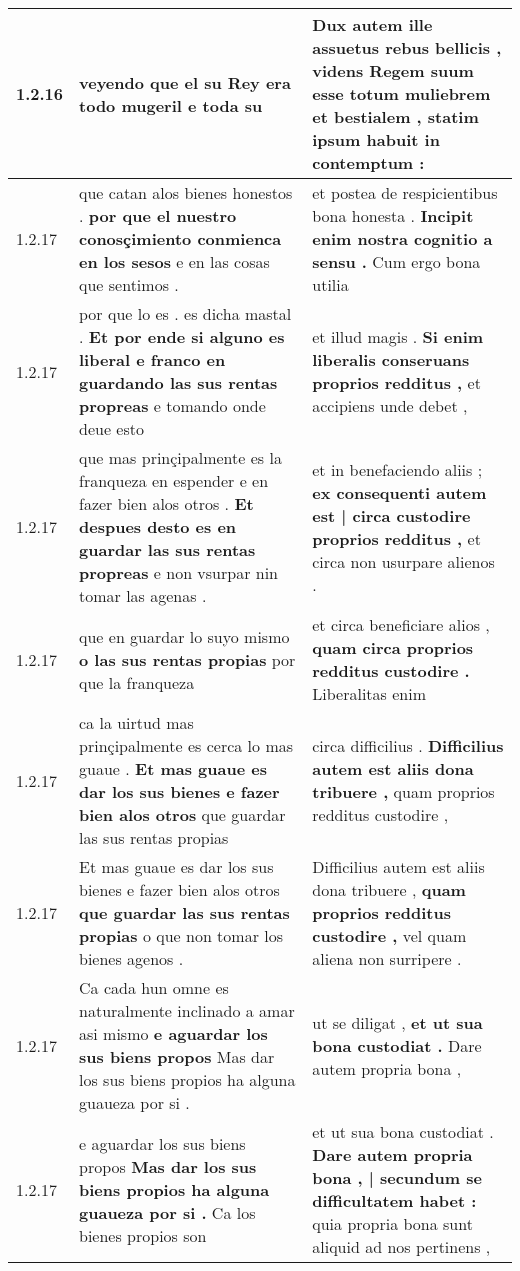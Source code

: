 \begin{tabular}{|p{1cm}|p{6.5cm}|p{6.5cm}|}
1.2.16 & veyendo \textbf{ que el su Rey era todo mugeril } e toda su & Dux autem ille assuetus rebus bellicis , \textbf{ videns Regem suum esse totum muliebrem et bestialem , } statim ipsum habuit in contemptum : \\\hline
1.2.17 & que catan alos bienes honestos . \textbf{ por que el nuestro conosçimiento conmienca en los sesos } e en las cosas que sentimos . & et postea de respicientibus bona honesta . \textbf{ Incipit enim nostra cognitio a sensu . } Cum ergo bona utilia \\\hline
1.2.17 & por que lo es . es dicha mastal . \textbf{ Et por ende si alguno es liberal e franco en guardando las sus rentas propreas } e tomando onde deue esto & et illud magis . \textbf{ Si enim liberalis conseruans proprios redditus , } et accipiens unde debet , \\\hline
1.2.17 & que mas prinçipalmente es la franqueza en espender e en fazer bien alos otros . \textbf{ Et despues desto es en guardar las sus rentas propreas } e non vsurpar nin tomar las agenas . & et in benefaciendo aliis ; \textbf{ ex consequenti autem est | circa custodire proprios redditus , } et circa non usurpare alienos . \\\hline
1.2.17 & que en guardar lo suyo mismo \textbf{ o las sus rentas propias } por que la franqueza & et circa beneficiare alios , \textbf{ quam circa proprios redditus custodire . } Liberalitas enim \\\hline
1.2.17 & ca la uirtud mas prinçipalmente es cerca lo mas guaue . \textbf{ Et mas guaue es dar los sus bienes e fazer bien alos otros } que guardar las sus rentas propias & circa difficilius . \textbf{ Difficilius autem est aliis dona tribuere , } quam proprios redditus custodire , \\\hline
1.2.17 & Et mas guaue es dar los sus bienes e fazer bien alos otros \textbf{ que guardar las sus rentas propias } o que non tomar los bienes agenos . & Difficilius autem est aliis dona tribuere , \textbf{ quam proprios redditus custodire , } vel quam aliena non surripere . \\\hline
1.2.17 & Ca cada hun omne es naturalmente inclinado a amar asi mismo \textbf{ e aguardar los sus biens propos } Mas dar los sus biens propios ha alguna guaueza por si . & ut se diligat , \textbf{ et ut sua bona custodiat . } Dare autem propria bona , \\\hline
1.2.17 & e aguardar los sus biens propos \textbf{ Mas dar los sus biens propios ha alguna guaueza por si . } Ca los bienes propios son & et ut sua bona custodiat . \textbf{ Dare autem propria bona , | secundum se difficultatem habet : } quia propria bona sunt aliquid ad nos pertinens , \\\hline

\end{tabular}
